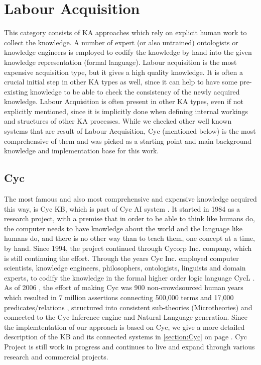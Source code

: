 \section{Labour Acquisition}
\label{section:LabourAcquisition}
This category consists of KA approaches which rely on explicit human work to 
collect the knowledge. A number of expert (or also untrained) ontologists or 
knowledge engineers is employed to codify the knowledge by hand into the given 
knowledge representation (formal language). Labour acquisition is the most 
expensive acquisition type, but it gives a high quality knowledge. It is often a
crucial initial step in other KA types as well, since it can help to have some 
pre-existing knowledge to be able to check the consistency of the newly acquired
knowledge. Labour Acquisition is often present in other KA types, even if not 
explicitly mentioned, since it is implicitly done when defining internal 
workings and structures of other KA processes. While we checked other well 
known systems that are result of Labour Acquisition, Cyc (mentioned below) is 
the most comprehensive of them and was picked as a starting point and main 
background knowledge and implementation base for this work.

\subsection{Cyc} The most famous and also most comprehensive and expensive 
knowledge acquired this way, is Cyc KB, which is part of Cyc AI system 
\parencite{Lenat1995}. It started in 1984 as a research project, with a premise 
that in order to be able to think like humans do, the computer needs to have 
knowledge about the world and the language like humans do, and there is no other
way than to teach them, one concept at a time, by hand. Since 1994, the project 
continued through Cycorp Inc. company, which is still continuing the effort. 
Through the years Cyc Inc. employed computer scientists, knowledge engineers, 
philosophers, ontologists, linguists and domain experts, to codify the knowledge
in the formal higher order logic language CycL \parencite{Matuszek2006a}. As of 2006
\parencite{Matuszek2006}, the effort of making Cyc was 900 non-crowdsourced 
human years which resulted in 7 million assertions connecting 500,000 terms and 
17,000 predicates/relations \parencite{Zang2013}, structured into consistent 
sub-theories (Microtheories) and connected to the Cyc Inference engine and 
Natural Language generation. Since the implemtentation of our approach is based
on Cyc, we give a more detailed description of the KB and its connected systems
in \autoref{section:Cyc} on page \pageref{section:Cyc}. Cyc Project is still 
work in progress and continues to live and expand through various research and
commercial projects.

